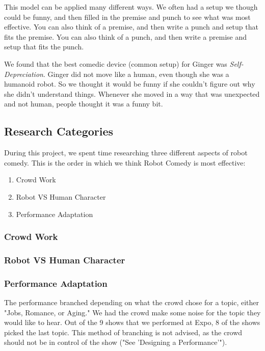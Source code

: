 This model can be applied many different ways.
We often had a setup we though could be funny, and then filled in the premise and punch to see what was most effective.
You can also think of a premise, and then write a punch and setup that fits the premise.
You can also think of a punch, and then write a premise and setup that fits the punch.

We found that the best comedic device (common setup) for Ginger was \textit{Self-Depreciation}.
Ginger did not move like a human, even though she was a humanoid robot.
So we thought it would be funny if she couldn't figure out why she didn't understand things.
Whenever she moved in a way that was unexpected and not human, people thought it was a funny bit.

\subsection{Research Categories}

    During this project, we spent time researching three different aspects of robot comedy. 
    This is the order in which we think Robot Comedy is most effective:

		\begin{enumerate}
			\item{Crowd Work}
			\item{Robot VS Human Character}
			\item{Performance Adaptation}
		\end{enumerate}

    \subsubsection{Crowd Work}
    \subsubsection{Robot VS Human Character}
    \subsubsection{Performance Adaptation}
        The performance branched depending on what the crowd chose for a topic, either "Jobs, Romance, or Aging."
        We had the crowd make some noise for the topic they would like to hear.
        Out of the 9 shows that we performed at Expo, 8 of the shows picked the last topic.
        This method of branching is not advised, as the crowd should not be in control of the show ("See 'Designing a Performance'").

